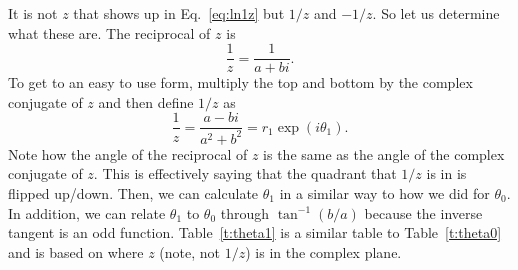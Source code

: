 It is not $z$ that shows up in Eq.~\ref{eq:ln1z} but $1/z$ and $-1/z$. 
So let us determine what these are. 
The reciprocal of $z$ is
\begin{equation}
	\frac{1}{z} =  \frac{1}{a+bi}.
\end{equation}
To get to an easy to use form, multiply the top and bottom by the complex conjugate of $z$
and then define $1/z$ as
\begin{equation}
	\frac{1}{z} = \frac{a-bi}{a^2 + b^2} = r_1 \exp(i \theta_1).
\end{equation}
Note how the angle of the reciprocal of $z$ is the same as the angle of the complex conjugate of $z$.
This is effectively saying that the quadrant that $1/z$ is in is flipped up/down.
Then, we can calculate $\theta_1$ in a similar way to how we did for $\theta_0$.
In addition, we can relate $\theta_1$ to $\theta_0$ through $\tan^{-1}(b/a)$ because the inverse tangent is an odd function.
Table~\ref{t:theta1} is a similar table to Table~\ref{t:theta0} and is based on where $z$ (note, not $1/z$) is in the complex plane.
